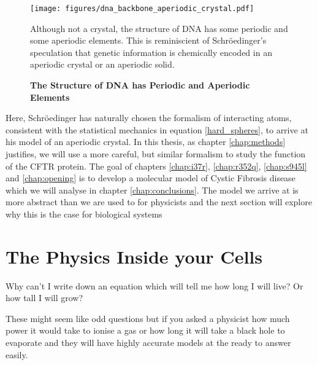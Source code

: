\begin{figure}
	\begin{center}
		\texttt{[image: figures/dna\_backbone\_aperiodic\_crystal.pdf]}
	\end{center}
	\captionsetup{singlelinecheck = false, justification=raggedright}
	\caption[The Structure of DNA has Periodic and Aperiodic Elements] {\textbf{The Structure of DNA has Periodic and Aperiodic Elements}}{Although not a crystal, the structure of DNA has some periodic and some aperiodic elements. This is reminiscient of Schr\"oedinger's speculation that genetic information is chemically encoded in an aperiodic crystal or an aperiodic solid. }
	\label{dna_structure}
\end{figure}

Here, Schr\"oedinger has naturally chosen the formalism of interacting atoms, consistent with the statistical mechanics in equation \ref{hard_spheres}, to arrive at his model of an aperiodic crystal. In this thesis, as chapter \ref{chap:methods} justifies, we will use a more careful, but similar formalism to study the function of the CFTR protein. The goal of chapters \ref{chap:i37r}, \ref{chap:r352q}, \ref{chap:s945l} and \ref{chap:opening} is to develop a molecular model of Cystic Fibrosis disease which we will analyse in chapter \ref{chap:conclusions}. The model we arrive at is more abstract than we are used to for physicists and the next section will explore why this is the case for biological systems
 


\section{The Physics Inside your Cells}

Why can't I write down an equation which will tell me how long I will live? Or how tall I will grow?

These might seem like odd questions but if you asked a physicist how much power it would take to ionise a gas or how long it will take a black hole to evaporate and they will have highly accurate models at the ready to answer easily. 

